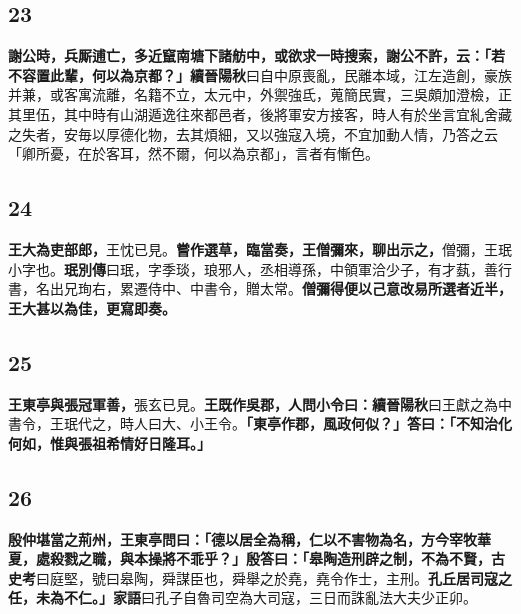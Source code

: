 \subsection*{23}

\textbf{謝公時，兵厮逋亡，多近竄南塘下諸舫中，或欲求一時搜索，謝公不許，云：「若不容置此輩，何以為京都？」}{\footnotesize \textbf{續晉陽秋}曰自中原喪亂，民離本域，江左造創，豪族并兼，或客寓流離，名籍不立，太元中，外禦強氐，蒐簡民實，三吳頗加澄檢，正其里伍，其中時有山湖遁逸往來都邑者，後將軍安方接客，時人有於坐言宜糺舍藏之失者，安毎以厚德化物，去其煩細，又以強寇入境，不宜加動人情，乃答之云「卿所憂，在於客耳，然不爾，何以為京都」，言者有慚色。}

\subsection*{24}

\textbf{王大為吏部郎，}{\footnotesize 王忱已見。}\textbf{嘗作選草，臨當奏，王僧彌來，聊出示之，}{\footnotesize 僧彌，王珉小字也。\textbf{珉別傳}曰珉，字季琰，琅邪人，丞相導孫，中領軍洽少子，有才蓺，善行書，名出兄珣右，累遷侍中、中書令，贈太常。}\textbf{僧彌得便以己意改易所選者近半，王大甚以為佳，更寫即奏。}

\subsection*{25}

\textbf{王東亭與張冠軍善，}{\footnotesize 張玄已見。}\textbf{王既作吳郡，人問小令曰：}{\footnotesize \textbf{續晉陽秋}曰王獻之為中書令，王珉代之，時人曰大、小王令。}\textbf{「東亭作郡，風政何似？」答曰：「不知治化何如，惟與張祖希情好日隆耳。」}

\subsection*{26}

\textbf{殷仲堪當之荊州，王東亭問曰：「德以居全為稱，仁以不害物為名，方今宰牧華夏，處殺戮之職，與本操將不乖乎？」殷答曰：「皋陶造刑辟之制，不為不賢，}{\footnotesize \textbf{古史考}曰庭堅，號曰皋陶，舜謀臣也，舜舉之於堯，堯令作士，主刑。}\textbf{孔丘居司寇之任，未為不仁。」}{\footnotesize \textbf{家語}曰孔子自魯司空為大司寇，三日而誅亂法大夫少正卯。}
